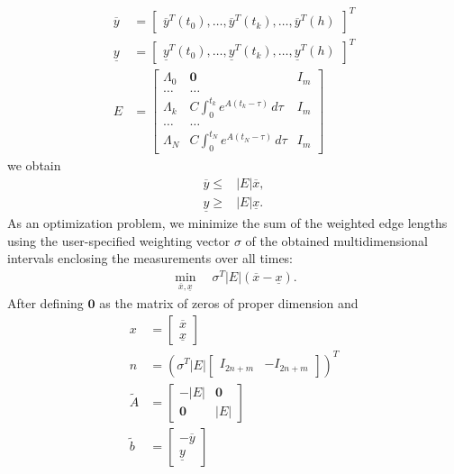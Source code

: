 \documentclass[EPiC]{easychair}
\renewcommand{\^}[1]{^{(#1)}}
\begin{document}
\begin{equation*}
 \begin{split}
  \overline{y} &= \begin{bmatrix} \overline{y}^T(t_0), \ldots, \overline{y}^T(t_k), \ldots, \overline{y}^T(h) \end{bmatrix}^T \\
  \underline{y} &= \begin{bmatrix} \underline{y}^T(t_0), \ldots, \underline{y}^T(t_k), \ldots, \underline{y}^T(h) \end{bmatrix}^T \\
  E &= \begin{bmatrix} \Lambda_0 & \mathbf{0} & I_m \\ \dots & \dots \\ \Lambda_k & C \int_{0}^{t_k}e^{A(t_k-\tau)} \, d\tau & I_m \\ \dots & \dots \\ \Lambda_N & C \int_{0}^{t_N}e^{A(t_N-\tau)} \, d\tau & I_m \end{bmatrix}
 \end{split}
\end{equation*}
we obtain 
\begin{equation}\label{eq:modeling:linConstraint}
\begin{split}
	\overline{y}  \leq & \left\vert E \right\vert  \overline{x}, \\
	\underline{y}  \geq & \left\vert E \right\vert \underline{x}.
\end{split}
\end{equation}
As an optimization problem, we minimize the sum of the weighted edge lengths using the user-specified weighting vector $\sigma$ of the obtained multidimensional intervals enclosing the measurements over all times:
\begin{gather}\label{eq:modeling:newobjective}
	\underset{\overline{x},\underline{x}} \min \quad \sigma^T |E| \left( \overline{x} - \underline{x} \right).
\end{gather}
After defining $\mathbf{0}$ as the matrix of zeros of proper dimension and
\begin{equation*}
 \begin{split}
  x &= \begin{bmatrix} \overline{x} \\ \underline{x} \end{bmatrix} \\
  n &= \left( \sigma^T |E| \begin{bmatrix} I_{2n+m} & -I_{2n+m} \end{bmatrix} \right)^T \\ 
  \tilde{A} &= \begin{bmatrix} -|E| & \mathbf{0} \\ \mathbf{0} & |E| \end{bmatrix} \\
  \tilde{b} &= \begin{bmatrix} -\overline{y} \\ \underline{y} \end{bmatrix}
 \end{split}
\end{equation*}
\end{document}
